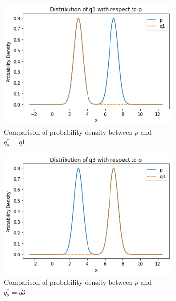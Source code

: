 \documentclass[12pt, a4paper]{book}
\begin{document}
\begin{figure}
    \begin{subfigure}{0.45\linewidth}
        \centering
        \includegraphics[width=\linewidth]{image/q1/q1p.png}
        \caption{Comparison of probability density between $p$ and $q_2^*=q1$}
    \end{subfigure}
    \hfil
    \begin{subfigure}{0.45\linewidth}
        \centering
        \includegraphics[width=\linewidth]{image/q1/q3p.png}
        \caption{Comparison of probability density between $p$ and $q_2^*=q3$}
    \end{subfigure}
    \newline
    \hspace*{2.5cm}
    \begin{subfigure}{0.5\linewidth}

\end{subfigure}
\end{figure}
\end{document}
